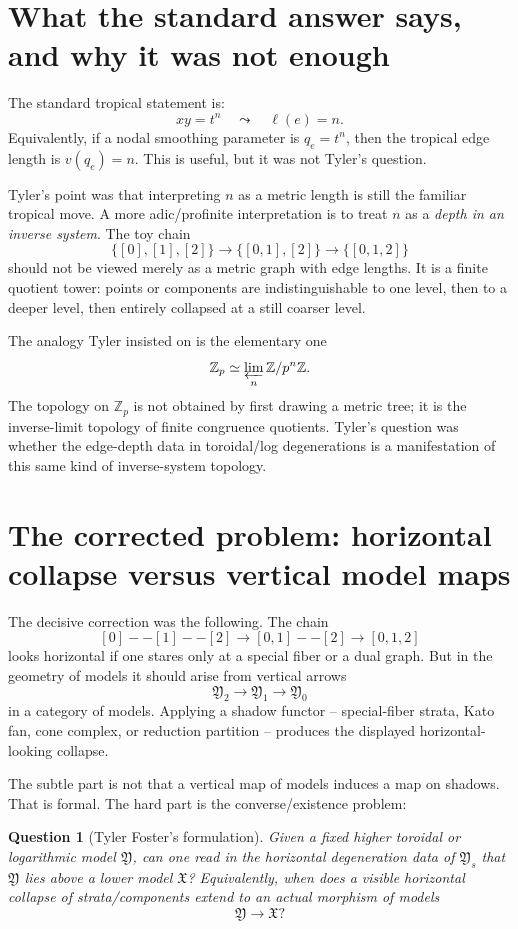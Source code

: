 \documentclass[11pt]{article}
\newtheorem{question}{Question}
\newcommand{\Z}{\mathbb Z}
\newcommand{\mfX}{\mathfrak X}
\newcommand{\mfY}{\mathfrak Y}
\begin{document}
\section{What the standard answer says, and why it was not enough}

The standard tropical statement is:
\[
xy=t^n \quad\leadsto\quad \ell(e)=n.
\]
Equivalently, if a nodal smoothing parameter is $q_e=t^n$, then the tropical edge length is $v(q_e)=n$.
This is useful, but it was not Tyler's question.

Tyler's point was that interpreting $n$ as a metric length is still the familiar tropical move. A more adic/profinite interpretation is to treat $n$ as a \emph{depth in an inverse system}. The toy chain
\[
\{[0],[1],[2]\}
\longrightarrow
\{[0,1],[2]\}
\longrightarrow
\{[0,1,2]\}
\]
should not be viewed merely as a metric graph with edge lengths. It is a finite quotient tower: points or components are indistinguishable to one level, then to a deeper level, then entirely collapsed at a still coarser level.

The analogy Tyler insisted on is the elementary one
\[
\Z_p \simeq \varprojlim_n \Z/p^n\Z.
\]
The topology on $\Z_p$ is not obtained by first drawing a metric tree; it is the inverse-limit topology of finite congruence quotients. Tyler's question was whether the edge-depth data in toroidal/log degenerations is a manifestation of this same kind of inverse-system topology.

\section{The corrected problem: horizontal collapse versus vertical model maps}

The decisive correction was the following. The chain
\[
[0]--[1]--[2]
\longrightarrow
[0,1]--[2]
\longrightarrow
[0,1,2]
\]
looks horizontal if one stares only at a special fiber or a dual graph. But in the geometry of models it should arise from vertical arrows
\[
\mfY_2\longrightarrow \mfY_1\longrightarrow \mfY_0
\]
in a category of models. Applying a shadow functor -- special-fiber strata, Kato fan, cone complex, or reduction partition -- produces the displayed horizontal-looking collapse.

The subtle part is not that a vertical map of models induces a map on shadows. That is formal. The hard part is the converse/existence problem:

\begin{question}[Tyler Foster's formulation]
Given a fixed higher toroidal or logarithmic model $\mfY$, can one read in the horizontal degeneration data of $\mfY_s$ that $\mfY$ lies above a lower model $\mfX$? Equivalently, when does a visible horizontal collapse of strata/components extend to an actual morphism of models
\[
\mfY\longrightarrow \mfX?
\]
\end{question}
\end{document}
